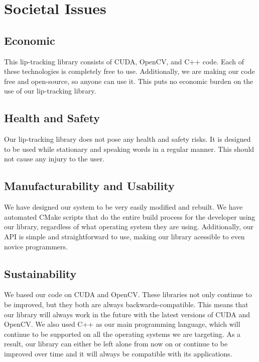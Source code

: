 \chapter{Societal Issues}

\section{Economic}
This lip-tracking library consists of CUDA, OpenCV, and C++ code. Each of these technologies is completely free to use. Additionally, we are making our code free and open-source, so anyone can use it. This puts no economic burden on the use of our lip-tracking library.

\section{Health and Safety}
Our lip-tracking library does not pose any health and safety risks. It is designed to be used while stationary and speaking words in a regular manner. This should not cause any injury to the user.

\section{Manufacturability and Usability}
We have designed our system to be very easily modified and rebuilt. We have automated CMake scripts that do the entire build process for the developer using our library, regardless of what operating system they are using. Additionally, our API is simple and straightforward to use, making our library acessible to even novice programmers.

\section{Sustainability}
We based our code on CUDA and OpenCV. These libraries not only continue to be improved, but they both are always backwards-compatible. This means that our library will always work in the future with the latest versions of CUDA and OpenCV. We also used C++ as our main programming language, which will continue to be supported on all the operating systems we are targeting. As a result, our library can either be left alone from now on or continue to be improved over time and it will always be compatible with its applications.

